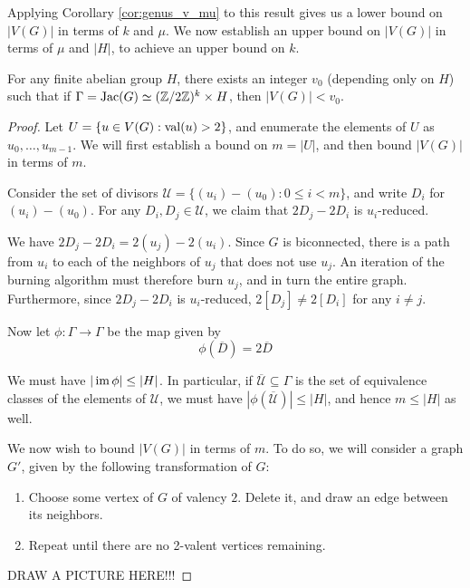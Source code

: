 \documentclass{amsart}
\begin{document}
Applying Corollary \ref{cor:genus_v_mu} to this result gives us a
lower bound on $|V(G)|$ in terms of $k$ and $\mu$. We now establish an
upper bound on $|V(G)|$ in terms of $\mu$ and $|H|$, to achieve an
upper bound on $k$.

\begin{prop}
  \label{prop:v_bound}
  For any finite abelian group $H$, there exists an integer $v_0$
  (depending only on $H$) such that if $\Gamma = \operatorname{Jac}(G) \simeq (\mathbb{Z}/2\mathbb{Z})^k
  \times H$, then $|V(G)| < v_0$.
\end{prop}

\begin{proof}
  Let $U = \{u \in V(G) : \operatorname{val}(u) > 2\}$, and enumerate the elements
  of $U$ as $u_0, \ldots, u_{m-1}$. We will first establish a bound on
  $m = |U|$, and then bound $|V(G)|$ in terms of $m$.
  
  Consider the set of divisors $\mathcal{U} = \{(u_i) - (u_0) : 0 \le
  i < m\}$, and write $D_i$ for $(u_i) - (u_0)$. For any $D_i, D_j \in
  \mathcal{U}$, we claim that $2D_j - 2D_i$ is $u_i$-reduced.

  We have $2D_j - 2D_i = 2(u_j) - 2(u_i)$. Since $G$ is biconnected,
  there is a path from $u_i$ to each of the neighbors of $u_j$ that
  does not use $u_j$. An iteration of the burning algorithm must
  therefore burn $u_j$, and in turn the entire graph. Furthermore,
  since $2D_j - 2D_i$ is $u_i$-reduced, $2[D_j] \ne 2[D_i]$ for any $i
  \ne j$.

  Now let $\phi:\Gamma \to \Gamma$ be the map given by
  \[
  \phi(\overline{D}) = 2\overline{D}
  \] 

  We must have $|\operatorname{im}{\phi}| \le |H|$. In particular, if
  $\overline{\mathcal{U}} \subseteq \Gamma$ is the set of equivalence
  classes of the elements of $\mathcal{U}$, we must have
  $|\phi(\overline{\mathcal{U}})| \le |H|$, and hence $m \le |H|$ as
  well.

  We now wish to bound $|V(G)|$ in terms of $m$. To do so, we will
  consider a graph $G'$, given by the following transformation of $G$:

  \begin{enumerate}
    \item Choose some vertex of $G$ of valency $2$. Delete it, and
      draw an edge between its neighbors.
    \item Repeat until there are no 2-valent vertices remaining.
  \end{enumerate}
  
  DRAW A PICTURE HERE!!!


\end{proof}
\end{document}
